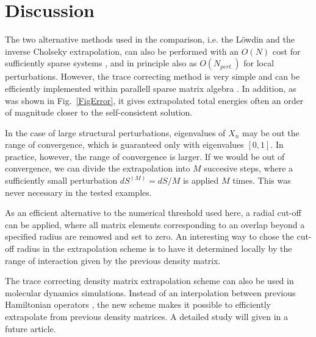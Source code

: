 \documentclass[twocolumn,showpacs,preprintnumbers,amsmath,amssymb]{revtex4}
\begin{document}
\section{Discussion}

The two alternative methods used in the comparison, i.e. the L\"{o}wdin and the inverse Cholseky extrapolation,
can also be performed with an $O(N)$ cost for sufficiently sparse systems \cite{Baer98,Challa99,NiklassonIR}, 
and in principle also as $O(N_{pert.})$ for local perturbations. However,
the trace correcting method is very simple and can be efficiently implemented within parallell
sparse matrix algebra \cite{Mondo_SCF}. In addition, as was shown in Fig.\ \ref{FigError},
it gives extrapolated total energies often an order of magnitude closer to the self-consistent solution. 

In the case of large structural perturbations, eigenvalues of $X_n$ may be 
out the range of convergence, which is guaranteed only with eigenvalues $[0,1]$. In practice, however,
the range of convergence is larger.  If we would be out of convergence, 
we can divide the extrapolation into $M$ succesive steps, where a sufficiently small 
perturbation $dS^{(M)} = dS/M$ is applied $M$ times. This was never necessary in
the tested examples.

As an efficient alternative to the numerical threshold used here, a radial cut-off can be applied,
where all matrix elements corresponding to an overlap beyond a specified radius are remowed
and set to zero. An interesting way to chose the cut-off radius in the extrapolation scheme
is to have it determined locally by the range of interaction given by the previous density matrix.

The trace correcting density matrix extrapolation scheme can also be used in 
molecular dynamics simulations. Instead of an interpolation between
previous Hamiltonian operators \cite{Pulay04}, the new scheme makes it possible to efficiently 
extrapolate from previous density matrices. A detailed study will given in a future article.
\end{document}
